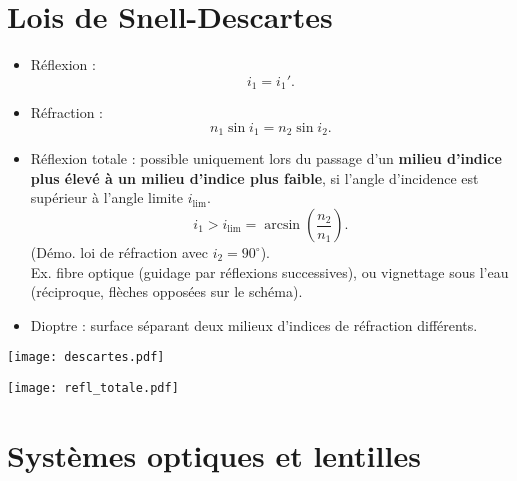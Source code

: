 \documentclass[a4paper,12pt]{article}
\begin{document}
\section{Lois de Snell-Descartes}

\noindent
\begin{minipage}{\textwidth}
    \begin{minipage}[c]{0.6\textwidth}
        \begin{itemize}[itemsep=0.5\baselineskip]
            \item Réflexion :
                \[ i_1 = i_1' .\]
                
            \item Réfraction :
                \[ n_1 \sin i_1 = n_2 \sin i_2 .\]
                
            \item Réflexion totale : possible uniquement lors du passage d'un \textbf{milieu d'indice plus élevé à un milieu d'indice plus faible}, si l'angle d'incidence est supérieur à l'angle limite $i_{\text{lim}}$.
                \[i_1 > i_{\text{lim}} = \arcsin\left(\frac{n_2}{n_1}\right) .\]
                (Démo. loi de réfraction avec $i_2 = 90^\circ$). \\
                Ex. fibre optique (guidage par réflexions successives), ou vignettage sous l'eau (réciproque, flèches opposées sur le schéma).
                
                
            
            \item Dioptre : surface séparant deux milieux d'indices de réfraction différents.
        \end{itemize}
    \end{minipage}%
    \begin{minipage}[c]{0.4\textwidth}
        \centering
        \texttt{[image: descartes.pdf]}
        
        \rule{0pt}{0.1cm}
        
        \texttt{[image: refl\_totale.pdf]}
    \end{minipage}
\end{minipage}


\section{Systèmes optiques et lentilles}
\end{document}
